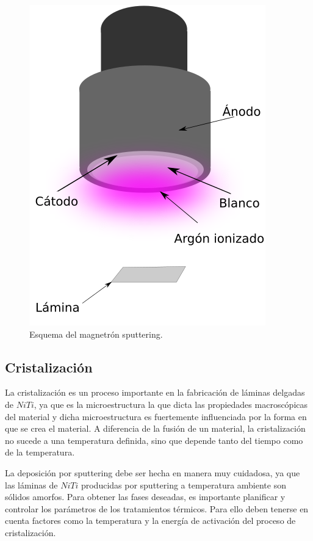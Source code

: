 \documentclass[12pt]{article}
\theoremstyle{definition}
\theoremstyle{remark}
\begin{document}
\begin{figure}[H]
	\centering
	\includegraphics[scale=0.5]{img/SchemaDeposition.png}
	\caption{Esquema del magnetrón sputtering.}
	\label{sputter}
\end{figure}

\subsection{Cristalización}

La cristalización es un proceso importante en la fabricación de láminas delgadas de $NiTi$, ya que es la microestructura la que dicta las propiedades macroscópicas del material y dicha microestructura es fuertemente influenciada por la forma en que se crea el material. A diferencia de la fusión de un material, la cristalización no sucede a una temperatura definida, sino que depende tanto del tiempo como de la temperatura.

La deposición por sputtering debe ser hecha en manera muy cuidadosa, ya que las láminas de $NiTi$ producidas por sputtering a temperatura ambiente son sólidos amorfos. Para obtener las fases deseadas, es importante planificar y controlar los parámetros de los tratamientos térmicos. Para ello deben tenerse en cuenta factores como la temperatura y la energía de activación del proceso de cristalización.
\end{document}

